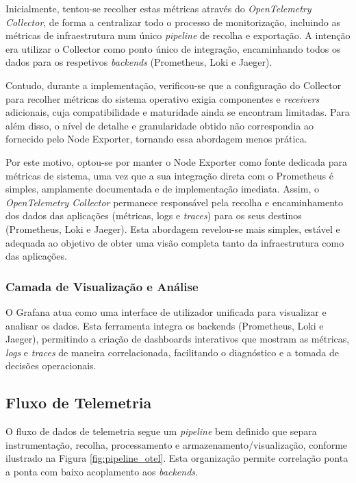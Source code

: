 Inicialmente, tentou-se recolher estas métricas através do \textit{OpenTelemetry Collector}, de forma a centralizar todo o processo de monitorização, incluindo as métricas de infraestrutura num único \textit{pipeline} de recolha e exportação. A intenção era utilizar o Collector como ponto único de integração, encaminhando todos os dados para os respetivos \textit{backends} (Prometheus, Loki e Jaeger).

Contudo, durante a implementação, verificou-se que a configuração do Collector para recolher métricas do sistema operativo exigia componentes e \textit{receivers} adicionais, cuja compatibilidade e maturidade ainda se encontram limitadas. Para além disso, o nível de detalhe e granularidade obtido não correspondia ao fornecido pelo Node Exporter, tornando essa abordagem menos prática.

Por este motivo, optou-se por manter o Node Exporter como fonte dedicada para métricas de sistema, uma vez que a sua integração direta com o Prometheus é simples, amplamente documentada e de implementação imediata. Assim, o \textit{OpenTelemetry Collector} permanece responsável pela recolha e encaminhamento dos dados das aplicações (métricas, logs e \textit{traces}) para os seus destinos (Prometheus, Loki e Jaeger). Esta abordagem revelou-se mais simples, estável e adequada ao objetivo de obter uma visão completa tanto da infraestrutura como das aplicações.


\subsubsection{Camada de Visualização e Análise}
O Grafana atua como uma interface de utilizador unificada para visualizar e analisar os dados. Esta ferramenta integra os backends (Prometheus, Loki e Jaeger), permitindo a criação de dashboards interativos que mostram as métricas, \textit{logs} e \textit{traces} de maneira correlacionada, facilitando o diagnóstico e a tomada de decisões operacionais.


\subsection{Fluxo de Telemetria}

O fluxo de dados de telemetria segue um \textit{pipeline} bem definido que separa instrumentação, recolha, processamento e armazenamento/visualização, conforme ilustrado na Figura \ref{fig:pipeline_otel}. Esta organização permite correlação ponta a ponta com baixo acoplamento aos \textit{backends}.

